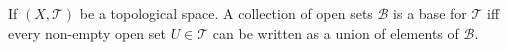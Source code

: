 \begin{prop}
    If $(X, \mathcal{T})$ be a topological space. A collection of open sets $\mathcal{B}$ is a base 
    for $\mathcal{T}$ iff every non-empty open set $U \in \mathcal{T}$ can be written
    as a union of elements of $\mathcal{B}$.
\end{prop}

